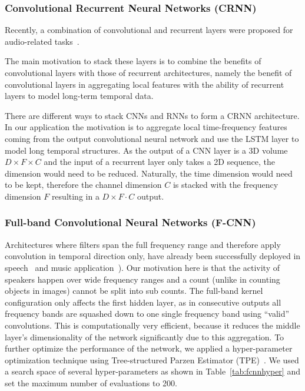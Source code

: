 \subsubsection{Convolutional Recurrent Neural Networks (CRNN)}%
Recently, a combination of convolutional and recurrent layers were proposed for audio-related tasks~\cite{sainath15, amodei16, Choi17, cakir17}.

The main motivation to stack these layers is to combine the benefits of convolutional layers with those of recurrent architectures, namely the benefit of convolutional layers in aggregating local features with the ability of recurrent layers to model long-term temporal data.

There are different ways to stack CNNs and RNNs to form a CRNN architecture.
In our application the motivation is to aggregate local time-frequency features coming from the output convolutional neural network and use the LSTM layer to model long temporal structures.
As the output of a CNN layer is a 3D volume \(D \times F \times C\) and the input of a recurrent layer only takes a 2D sequence, the dimension would need to be reduced. Naturally, the time dimension would need to be kept, therefore the channel dimension \(C\) is stacked with the frequency dimension \(F\) resulting in a \(D \times F \cdot C\) output.


\subsubsection{Full-band Convolutional Neural Networks (F-CNN)}%
Architectures where filters span the full frequency range and therefore apply convolution in temporal direction only, have already been successfully deployed in speech~\cite{amodei16} and music application~\cite{Choi17, pons16, Dieleman14}).
Our motivation here is that the activity of speakers happen over wide frequency ranges and a count (unlike in counting objects in images) cannot be split into sub counts.
The full-band kernel configuration only affects the first hidden layer, as in consecutive outputs all frequency bands are squashed down to one single frequency band using ``valid'' convolutions.
This is computationally very efficient, because it reduces the middle layer's dimensionality of the network significantly due to this aggregation.
To further optimize the performance of the network, we applied a hyper-parameter optimization technique using Tree-structured Parzen Estimator (TPE)~\cite{bergstra11}.
We used a search space of several hyper-parameters as shown in Table~\ref{tab:fcnnhyper} and set the maximum number of evaluations to 200.

